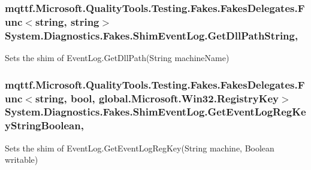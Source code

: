 \hypertarget{class_system_1_1_diagnostics_1_1_fakes_1_1_shim_event_log_a383ea950daeb426e6fa7ceb985eaca0f}{
\subsubsection[{Get\-Dll\-Path\-String}]{\setlength{\rightskip}{0pt plus 5cm}mqttf.\-Microsoft.\-Quality\-Tools.\-Testing.\-Fakes.\-Fakes\-Delegates.\-Func$<$string, string$>$ System.\-Diagnostics.\-Fakes.\-Shim\-Event\-Log.\-Get\-Dll\-Path\-String\hspace{0.3cm}{\ttfamily [static]}, {\ttfamily [set]}}}\label{class_system_1_1_diagnostics_1_1_fakes_1_1_shim_event_log_a383ea950daeb426e6fa7ceb985eaca0f}


Sets the shim of Event\-Log.\-Get\-Dll\-Path(\-String machine\-Name)

\hypertarget{class_system_1_1_diagnostics_1_1_fakes_1_1_shim_event_log_a6b303ef759edeacf5717b18eff334ed1}{
\subsubsection[{Get\-Event\-Log\-Reg\-Key\-String\-Boolean}]{\setlength{\rightskip}{0pt plus 5cm}mqttf.\-Microsoft.\-Quality\-Tools.\-Testing.\-Fakes.\-Fakes\-Delegates.\-Func$<$string, bool, global.\-Microsoft.\-Win32.\-Registry\-Key$>$ System.\-Diagnostics.\-Fakes.\-Shim\-Event\-Log.\-Get\-Event\-Log\-Reg\-Key\-String\-Boolean\hspace{0.3cm}{\ttfamily [static]}, {\ttfamily [set]}}}\label{class_system_1_1_diagnostics_1_1_fakes_1_1_shim_event_log_a6b303ef759edeacf5717b18eff334ed1}


Sets the shim of Event\-Log.\-Get\-Event\-Log\-Reg\-Key(\-String machine, Boolean writable)

